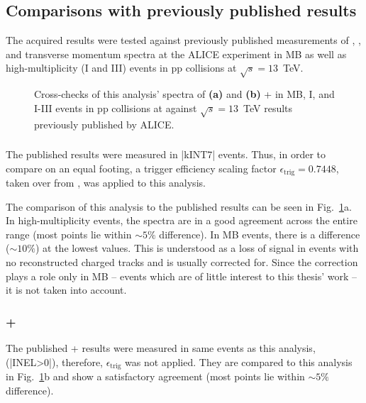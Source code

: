 \subsection{Comparisons with previously published results}

The acquired results were tested against previously published measurements of \KOs, \LA, and \AL transverse momentum spectra at the ALICE experiment in MB as well as high-multiplicity (\VOM I and \VOM III) events in pp collisions at $\sqrt{s} = 13$~TeV.

\begin{figure}%
{}%
\caption{Cross-checks of this analysis' \pt spectra of \textbf{(a)} \KOs and \textbf{(b)} \LA + \AL in MB, \VOM I, and \VOM I-III events in pp collisions at against $\sqrt{s} = 13$~TeV results previously published by ALICE.}%
\label{fig:analysis:xcheck}%
\end{figure}

\subsubsection*{\KOs}

The published \KOs results were measured in \spverb|kINT7| events. \cite{} Thus, in order to compare on an equal footing, a trigger efficiency scaling factor $\epsilon_\mathrm{trig} = 0.7448$, taken over from \cite{}, was applied to this analysis.

The comparison of this analysis to the published results can be seen in Fig.~\ref{fig:analysis:xcheck}a. In high-multiplicity events, the spectra are in a good agreement across the entire \pt range (most points lie within $\sim 5\%$ difference). In MB events, there is a difference ($\sim 10 \%$) at the lowest \pt values. This is understood as a loss of signal in events with no reconstructed charged tracks and is usually corrected for. Since the correction plays a role only in MB -- events which are of little interest to this thesis' work -- it is not taken into account.

\subsubsection*{\LA + \AL}

The published \LA + \AL results were measured in same events as this analysis, (\spverb|INEL>0|), therefore, $\epsilon_\mathrm{trig}$ was not applied. \cite{} They are compared to this analysis in Fig.~\ref{fig:analysis:xcheck}b and show a satisfactory agreement (most points lie within $\sim 5\%$ difference).

